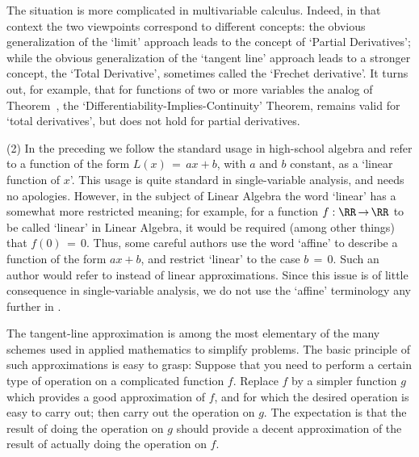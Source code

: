         The situation is more complicated in multivariable calculus.
    Indeed, in that context the two viewpoints correspond to different concepts:
    the obvious generalization of the `limit' approach leads to the concept of `Partial Derivatives';
    while the obvious generalization of the `tangent line' approach leads to a stronger concept, the `Total Derivative', sometimes called the `Frechet derivative'.
    It turns out, for example, that for functions of two or more variables the analog of Theorem~,
    the `Differentiability-Implies-Continuity' Theorem,
    remains valid for `total derivatives', but does not hold for partial derivatives.

\V

        (2) In the preceding we follow the standard usage in high-school algebra and refer to a function of the form $L(x) \,=\, ax+b$,
    with $a$ and $b$ constant, as a `linear function of $x$'. This usage is quite standard in single-variable analysis, and needs no apologies.
    However, in the subject of Linear Algebra the word `linear' has a somewhat more restricted meaning;
for example, for a function $f:{\RR} \,{\rightarrow}\, {\RR}$ to be called `linear' in Linear Algebra,
    it would be required (among other things) that $f(0) \,=\, 0$. Thus, some careful authors
    use the word `affine' to describe a function of the form $ax+b$, and restrict `linear' to the case $b \,=\, 0$.
    Such an author would refer to {\bf {}} instead of linear approximations.
    Since this issue is of little consequence in single-variable analysis, we do not use the `affine' terminology any further in {\ThisText}.

\VV

        The tangent-line approximation is among the most elementary of the many schemes used in applied mathematics to simplify problems.
    The basic principle of such approximations is easy to grasp: Suppose that you need to perform a certain type of operation on a complicated function $f$. 
    Replace $f$ by a simpler function $g$ which provides a good approximation of $f$, and for which the desired operation is easy to carry out;
    then carry out the operation on $g$. The expectation is that the result of doing the operation on $g$
    should provide a decent approximation of the result of actually doing the operation on $f$.

